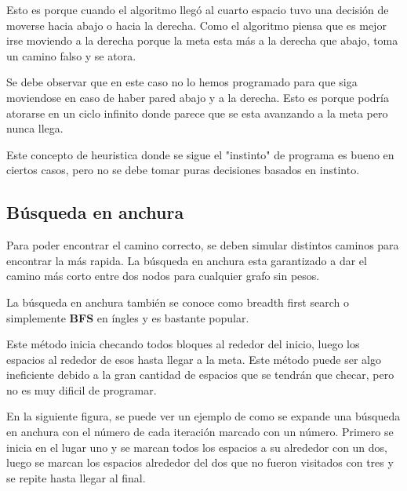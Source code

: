 \documentclass{article}
\begin{document}
Esto es porque cuando el algoritmo llegó al cuarto espacio tuvo una decisión de moverse hacia abajo o hacia la derecha. Como el algoritmo piensa que es mejor irse moviendo a la derecha porque la meta esta más a la derecha que abajo, toma un camino falso y se atora.

Se debe observar que en este caso no lo hemos programado para que siga moviendose en caso de haber pared abajo y a la derecha. Esto es porque podría atorarse en un ciclo infinito donde parece que se esta avanzando a la meta pero nunca llega.

Este concepto de heuristica donde se sigue el "instinto" de programa es bueno en ciertos casos, pero no se debe tomar puras decisiones basados en instinto.

\subsection{Búsqueda en anchura}

Para poder encontrar el camino correcto, se deben simular distintos caminos para encontrar la más rapida. La búsqueda en anchura esta garantizado a dar el camino más corto entre dos nodos para cualquier grafo sin pesos.

La búsqueda en anchura también se conoce como breadth first search o simplemente \textbf{BFS} en íngles y es bastante popular.

Este método inicia checando todos bloques al rededor del inicio, luego los espacios al rededor de esos hasta llegar a la meta. Este método puede ser algo ineficiente debido a la gran cantidad de espacios que se tendrán que checar, pero no es muy dificil de programar.

En la siguiente figura, se puede ver un ejemplo de como se expande una búsqueda en anchura con el número de cada iteración marcado con un número. Primero se inicia en el lugar uno y se marcan todos los espacios a su alrededor con un dos, luego se marcan los espacios alrededor del dos que no fueron visitados con tres y se repite hasta llegar al final.
\end{document}
